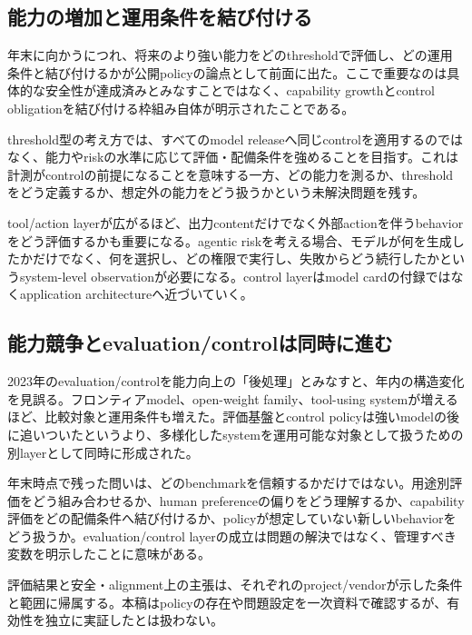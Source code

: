 \subsection{能力の増加と運用条件を結び付ける}

年末に向かうにつれ、将来のより強い能力をどのthresholdで評価し、どの運用条件と結び付けるかが公開policyの論点として前面に出た。ここで重要なのは具体的な安全性が達成済みとみなすことではなく、capability growthとcontrol obligationを結び付ける枠組み自体が明示されたことである。\autocite{src-25adcaa1c831,src-394ea6d17701,src-8f63dfa1697f,src-a1c8df89a3c9,src-b276b4af9d56,src-b6a5fdb87e9f}


threshold型の考え方では、すべてのmodel releaseへ同じcontrolを適用するのではなく、能力やriskの水準に応じて評価・配備条件を強めることを目指す。これは計測がcontrolの前提になることを意味する一方、どの能力を測るか、thresholdをどう定義するか、想定外の能力をどう扱うかという未解決問題を残す。\autocite{src-25adcaa1c831,src-394ea6d17701,src-8f63dfa1697f,src-a1c8df89a3c9,src-b276b4af9d56,src-b6a5fdb87e9f}


tool/action layerが広がるほど、出力contentだけでなく外部actionを伴うbehaviorをどう評価するかも重要になる。agentic riskを考える場合、モデルが何を生成したかだけでなく、何を選択し、どの権限で実行し、失敗からどう続行したかというsystem-level observationが必要になる。control layerはmodel cardの付録ではなくapplication architectureへ近づいていく。\autocite{src-25adcaa1c831,src-394ea6d17701,src-8f63dfa1697f,src-a1c8df89a3c9,src-b276b4af9d56,src-b6a5fdb87e9f}


\subsection{能力競争とevaluation/controlは同時に進む}

2023年のevaluation/controlを能力向上の「後処理」とみなすと、年内の構造変化を見誤る。フロンティアmodel、open-weight family、tool-using systemが増えるほど、比較対象と運用条件も増えた。評価基盤とcontrol policyは強いmodelの後に追いついたというより、多様化したsystemを運用可能な対象として扱うための別layerとして同時に形成された。\autocite{src-14f8acc117f1,src-1df7a91d31ec,src-25adcaa1c831,src-394ea6d17701,src-8f63dfa1697f,src-a1c8df89a3c9,src-b276b4af9d56,src-b2d10cbd609c,src-b6a5fdb87e9f}


年末時点で残った問いは、どのbenchmarkを信頼するかだけではない。用途別評価をどう組み合わせるか、human preferenceの偏りをどう理解するか、capability評価をどの配備条件へ結び付けるか、policyが想定していない新しいbehaviorをどう扱うか。evaluation/control layerの成立は問題の解決ではなく、管理すべき変数を明示したことに意味がある。\autocite{src-14f8acc117f1,src-1df7a91d31ec,src-25adcaa1c831,src-394ea6d17701,src-8f63dfa1697f,src-a1c8df89a3c9,src-b276b4af9d56,src-b2d10cbd609c,src-b6a5fdb87e9f}


\begin{claimboundary}
評価結果と安全・alignment上の主張は、それぞれのproject/vendorが示した条件と範囲に帰属する。本稿はpolicyの存在や問題設定を一次資料で確認するが、有効性を独立に実証したとは扱わない。\autocite{src-25adcaa1c831,src-a1c8df89a3c9,src-b276b4af9d56,src-b6a5fdb87e9f}
\end{claimboundary}

